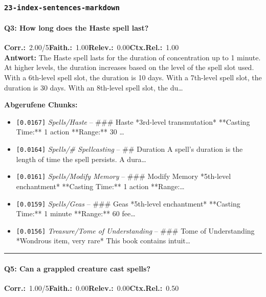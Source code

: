 \subsubsection*{\texttt{23-index-sentences-markdown}}
\label{app:samples:23_index_sentences_markdown}

\paragraph{Q3: How long does the Haste spell last?}
\noindent \textbf{Corr.:}~2.00/5\quad \textbf{Faith.:}~1.00\quad \textbf{Relev.:}~0.00\quad \textbf{Ctx.Rel.:}~1.00\\

\noindent\textbf{Antwort:} The Haste spell lasts for the duration of concentration up to 1 minute. At higher levels, the duration increases based on the level of the spell slot used. With a 6th-level spell slot, the duration is 10 days. With a 7th-level spell slot, the duration is 30 days. With an 8th-level spell slot, the du\ldots

\noindent\textbf{Abgerufene Chunks:}
\begin{itemize}[noitemsep, topsep=2pt]
  \item[\textbf{\#1}] \texttt{[0.0167]} \textit{Spells/Haste} -- \#\#\# Haste  *3rd-level transmutation*  **Casting Time:** 1 action  **Range:** 30 \ldots
  \item[\textbf{\#2}] \texttt{[0.0164]} \textit{Spells/# Spellcasting} -- \#\# Duration  A spell's duration is the length of time the spell persists. A dura\ldots
  \item[\textbf{\#3}] \texttt{[0.0161]} \textit{Spells/Modify Memory} -- \#\#\# Modify Memory  *5th-level enchantment*  **Casting Time:** 1 action  **Range:\ldots
  \item[\textbf{\#4}] \texttt{[0.0159]} \textit{Spells/Geas} -- \#\#\# Geas  *5th-level enchantment*  **Casting Time:** 1 minute  **Range:** 60 fee\ldots
  \item[\textbf{\#5}] \texttt{[0.0156]} \textit{Treasure/Tome of Understanding} -- \#\#\# Tome of Understanding  *Wondrous item, very rare*  This book contains intuit\ldots
\end{itemize}
\vspace{4pt}
\hrule
\vspace{6pt}

\paragraph{Q5: Can a grappled creature cast spells?}
\noindent \textbf{Corr.:}~1.00/5\quad \textbf{Faith.:}~0.00\quad \textbf{Relev.:}~0.00\quad \textbf{Ctx.Rel.:}~0.50\\

